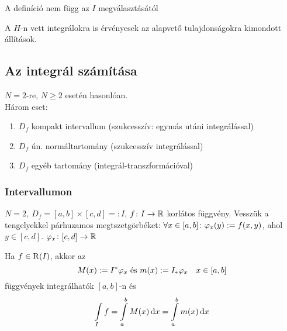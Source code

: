 \begin{Megj}
  \item A definíció nem függ az $I$ megválasztásától
    \item A $H$-n vett integrálokra is érvényesek az alapvető tulajdonságokra kimondott állítások.
\end{Megj}

\subsection{Az integrál számítása}
$N=2$-re, $N\geq 2$ esetén hasonlóan.\\
Három eset:
\begin{enumerate}
\item $D_f$ kompakt intervallum (szukcesszív: egymás utáni integrálással)
\item $D_f$ ún. normáltartomány (szukcesszív integrálással)
\item $D_f$ egyéb tartomány (integrál-transzformációval)
\end{enumerate}

\subsubsection{Intervallumon}
$N=2,\ D_f=[a,b]\times[c,d]=:I$, $f\colon I\to\mathbb{R}$ korlátos függvény. Vesszük a tengelyekkel párhuzamos megtszetgörbéket:
$\forall x\in[a,b]\colon\varphi_x(y):=f(x,y)$, ahol $y\in[c,d]$. $\varphi_x\colon[c,d]\to\mathbb{R}$


\begin{te}Ha $f\in\operatorname{R}(I)$, akkor az
\[M(x):=I^*\varphi_x\text{ és }m(x):=I_*\varphi_x\quad x\in[a,b]\]
függvények integrálhatók $[a,b]$-n és
\[\Int_If=\Int_a^bM(x)\diff x=\Int_a^bm(x)\diff x\]
\end{te}

